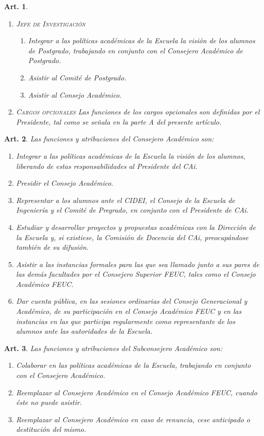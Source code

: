 \documentclass[letterpaper,11pt]{article}
\theoremstyle{plain}
\newtheorem{art}{Art.} %
\begin{document}
\begin{art}
\begin{enumerate}
				\item \textsc{Jefe de Investigación}
					\begin{enumerate}
						\item Integrar a las políticas académicas de la Escuela la visión de los alumnos de Postgrado, trabajando en conjunto con el Consejero Académico de Postgrado.
						\item Asistir al Comité de Postgrado.
						\item Asistir al Consejo Académico.
					\end{enumerate}
					
				\item \textsc{Cargos opcionales}
					Las funciones de los cargos opcionales son definidas por el Presidente, tal como se señala en la parte A del presente artículo. 
			\end{enumerate}
		\end{art}

		\begin{art}\label{funcionesCAPregrado}
			Las funciones y atribuciones del Consejero Académico son:
			\begin{enumerate}
				\item Integrar a las políticas académicas de la Escuela la visión de los alumnos, liberando de estas responsabilidades al Presidente del CAi.
				\item Presidir el Consejo Académico.
				\item Representar a los alumnos ante el \emph{CIDEI}, el Consejo de la Escuela de Ingeniería y el Comité de Pregrado, en conjunto con el Presidente de CAi.
				\item Estudiar y desarrollar proyectos y propuestas académicas con la Dirección de la Escuela y, si existiese, la Comisión de Docencia del CAi, preocupándose también de su difusión.
				\item Asistir a las instancias formales para las que sea llamado junto a sus pares de las demás facultades por el Consejero Superior FEUC, tales como el Consejo Académico FEUC.
				\item Dar cuenta pública, en las sesiones ordinarias del Consejo Generacional y Académico, de su participación en el Consejo Académico FEUC y en las instancias en las que participa regularmente como representante de los alumnos ante las autoridades de la Escuela.
			\end{enumerate}
		\end{art}

		\begin{art}
			Las funciones y atribuciones del Subconsejero Académico son:
			\begin{enumerate}
				\item Colaborar en las políticas académicas de la Escuela, trabajando en conjunto con el Consejero Académico.
				\item Reemplazar al Consejero Académico en el Consejo Académico FEUC, cuando éste no puede asistir.
				\item Reemplazar al Consejero Académico en caso de renuncia, cese anticipado o destitución del mismo.
			\end{enumerate}
		\end{art}
\end{document}
